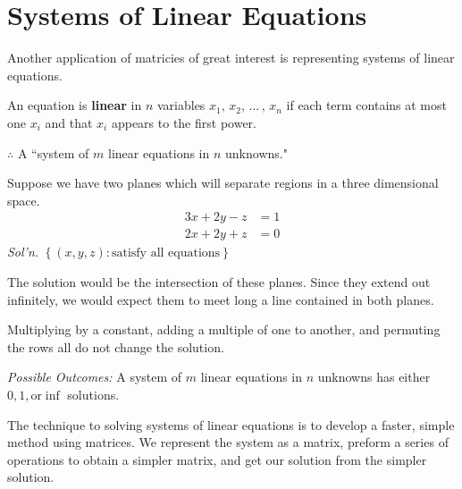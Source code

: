 \documentclass[../main.tex]{subfiles}
\begin{document}

\section{Systems of Linear Equations}

Another application of matricies of great interest is representing systems of linear equations.

\begin{definition}
    An equation is \textbf{linear} in \( n \) variables \( x_1, \, x_2, \,  \dots \, ,\,  x_n \)
    if each term contains at most one \( x_i \) and that \( x_i \) appears to the first power.
\end{definition}

\( \therefore \) A ``system of \( m \) linear equations in \( n \) unknowns."

\begin{example}
    Suppose we have two planes which will separate regions in a three dimensional space.
    \[ \begin{aligned}
        3x + 2y - z &= 1 \\
        2x + 2y + z & = 0
    \end{aligned} \]
    \textit{Sol'n.} \( \left\{ (x,y,z) : \text{satisfy all equations} \right\} \)
    
    The solution would be the intersection of these planes.
    Since they extend out infinitely, we would expect them to meet long a line contained in both planes.
\end{example}

\begin{note}
    Multiplying by a constant, adding a multiple of one to another, and permuting the rows all do not change the solution.
\end{note}

\emph{Possible Outcomes:} A system of \( m \) linear equations in \( n \) unknowns has either \( 0, 1, \text{or} \inf \) solutions.

The technique to solving systems of linear equations is to develop a faster, simple method using matrices.
We represent the system as a matrix, preform a series of operations to obtain a simpler matrix, and get our solution from the simpler solution.
\end{document}
